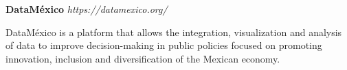 \item
\headerrow
{\textbf{DataMéxico}}
{\emph{https://datamexico.org/}}
\begin{itemize*}
    \item DataMéxico is a platform that allows the integration, visualization 
    and analysis of data to improve decision-making in public policies focused 
    on promoting innovation, inclusion and diversification of the Mexican economy.
\end{itemize*}
